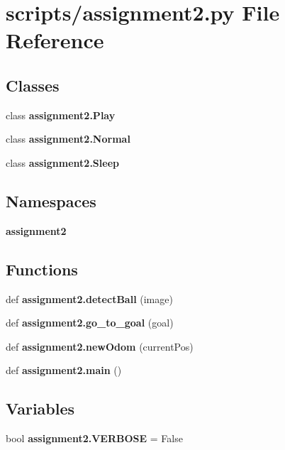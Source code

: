 \section{scripts/assignment2.py File Reference}
\label{assignment2_8py}
\subsection*{Classes}
\begin{DoxyCompactItemize}
\item 
class \textbf{ assignment2.\+Play}
\item 
class \textbf{ assignment2.\+Normal}
\item 
class \textbf{ assignment2.\+Sleep}
\end{DoxyCompactItemize}
\subsection*{Namespaces}
\begin{DoxyCompactItemize}
\item 
 \textbf{ assignment2}
\end{DoxyCompactItemize}
\subsection*{Functions}
\begin{DoxyCompactItemize}
\item 
def \textbf{ assignment2.\+detect\+Ball} (image)
\item 
def \textbf{ assignment2.\+go\+\_\+to\+\_\+goal} (goal)
\item 
def \textbf{ assignment2.\+new\+Odom} (current\+Pos)
\item 
def \textbf{ assignment2.\+main} ()
\end{DoxyCompactItemize}
\subsection*{Variables}
\begin{DoxyCompactItemize}
\item 
bool \textbf{ assignment2.\+V\+E\+R\+B\+O\+SE} = False
\end{DoxyCompactItemize}
